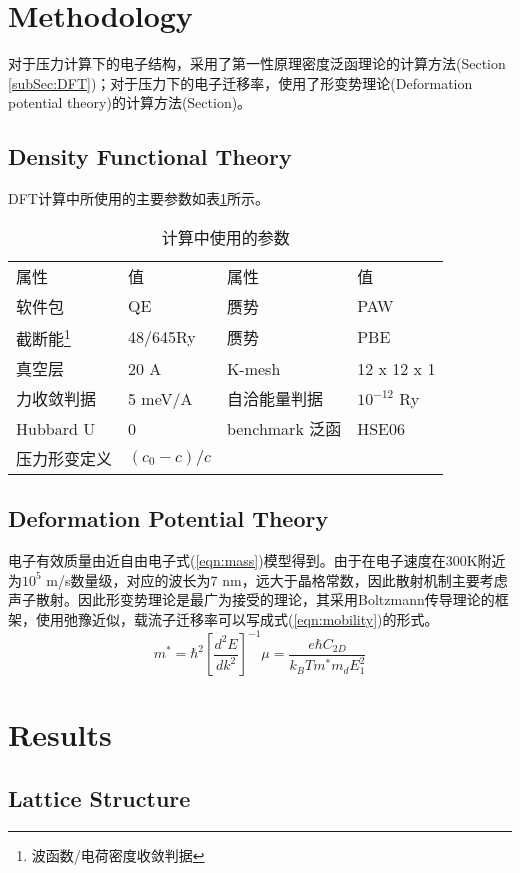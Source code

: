 \documentclass[reprint, aps, prb, showkeys]{revtex4-2}
\begin{document}
\section{Methodology}
对于压力计算下的电子结构，采用了第一性原理密度泛函理论的计算方法(Section \ref{subSec:DFT})；对于压力下的电子迁移率，使用了形变势理论(Deformation potential theory)的计算方法(Section)。
\subsection{Density Functional Theory \label{subSec:DFT}}
DFT计算中所使用的主要参数如表\ref{Tab:DFTparameter}所示。
\begin{table}[b]
    \caption{\label{Tab:DFTparameter} 计算中使用的参数} 
\begin{ruledtabular}
    \begin{tabular}{llll}
    \textrm{属性}&
    \textrm{值}&
    \textrm{属性}&
    \textrm{值}\\
    软件包          & QE        & 赝势              & PAW \\
    截断能\footnote{波函数/电荷密度收敛判据}& 48/645Ry  & 赝势              & PBE \\
    真空层          & 20 A      & K-mesh            & 12 x 12 x 1 \\
    力收敛判据      & 5 meV/A   & 自洽能量判据      & $10^{-12}$ Ry \\
    Hubbard U       & 0         & benchmark 泛函    & HSE06 \\
    压力形变定义     & $(c_0 - c)/c$ &  &  \\  
    \end{tabular}
\end{ruledtabular}
\end{table}

\subsection{Deformation Potential Theory}
电子有效质量由近自由电子式(\ref{eqn:mass})模型得到。由于在电子速度在300K附近为$10^{5}$ m/s数量级，对应的波长为7 nm，远大于晶格常数，因此散射机制主要考虑声子散射。因此形变势理论是最广为接受的理论，其采用Boltzmann传导理论的框架，使用弛豫近似，载流子迁移率可以写成式(\ref{eqn:mobility})的形式。
\begin{subequations}
\begin{equation}
    m^{*} = \hbar^2 [\frac{d^2E}{dk^2}]^{-1}
    \label{eqn:mass}
\end{equation}

\begin{equation}
    \mu = \frac{e{\hbar}C_{2D}}{k_B Tm^{*}m_d E_1^2}
    \label{eqn:mobility}
\end{equation}
\end{subequations}

\section{Results}
\subsection{Lattice Structure}
\end{document}
